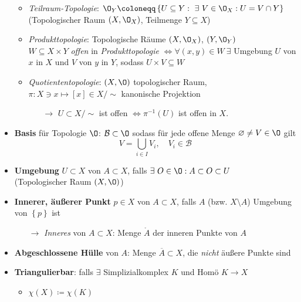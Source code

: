 \begin{itemize}
\begin{itemize}
\begin{itemize}
    \end{itemize}
    \item \emph{Teilraum-Topologie}: \( \O_Y \coloneqq \left \{ U \subseteq Y : \ \exists \ V \in \O_X : U = V \cap Y \right \} \) \\ (Topologischer Raum \( (X, \O_X) \), Teilmenge \( Y \subseteq X \))
    \item \emph{Produkttopologie}: Topologische Räume \( (X, \O_X) \), \( (Y, \O_Y) \) \\ \( W \subseteq X \times Y \) \emph{offen} in \emph{Produkttopologie} \( \Leftrightarrow \forall (x,y) \in W \ \exists \) Umgebung \( U \) von \( x \) in \( X \) und \( V \) von \( y \) in \( Y \), sodass \( U \times V \subseteq W \)
    \item \emph{Quotiententopologie}: \( (X, \O) \) topologischer Raum, \( \pi : X \ni x \mapsto [x] \in X/\sim \) kanonische Projektion
    \begin{itemize}
      \item[\( \to \)] \( U \subset X/\sim \) ist offen \( \Leftrightarrow \pi^{-1}(U) \) ist offen in \( X \).
    \end{itemize}
  \end{itemize}
  \item \textbf{Basis} für Topologie \( \O \): \( \mathcal{B} \subset \O \) sodass für jede offene Menge \( \varnothing \neq V \in \O \) gilt
  \begin{equation*}
    V = \bigcup_{i \in I} V_i, \quad V_i \in \mathcal{B}
  \end{equation*}
  \item \textbf{Umgebung} \( U \subset X \) von \( A \subset X \), falls \( \exists \ O \in \O : A \subset O \subset U \) \\
  (Topologischer Raum \( (X, \O) \))
  \item \textbf{Innerer, äußerer Punkt} \( p \in X \) von \( A \subset X \), falls \( A \) (bzw. \( X \setminus A \)) Umgebung von \( \left \{ p \right \} \) ist
  \begin{itemize}
    \item[\( \to \)] \emph{Inneres} von \( A \subset X \): Menge \( \mathring{A} \) der inneren Punkte von \( A \)
  \end{itemize}
  \item \textbf{Abgeschlossene Hülle} von \( A \): Menge \( \overline{A} \subset X \), die \emph{nicht} äußere Punkte sind
  \item \textbf{Triangulierbar}: falls \( \exists \) Simplizialkomplex \( K \) und Homö \( K \to X \)
  \begin{itemize}
    \item \( \chi(X) \coloneqq \chi(K) \)
  \end{itemize}
\end{itemize}

